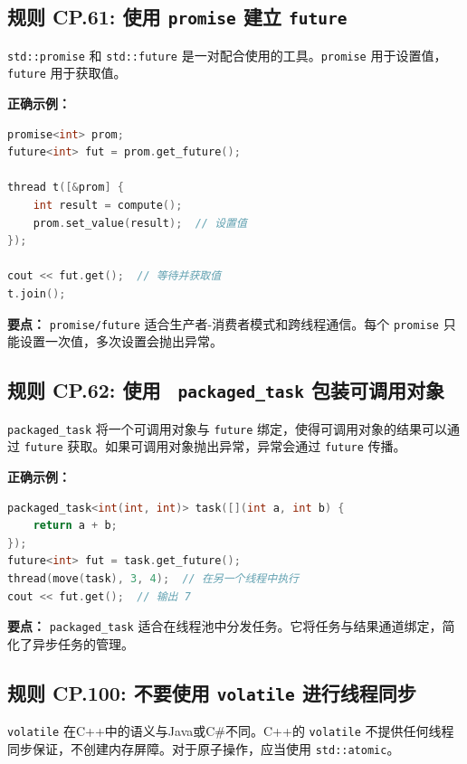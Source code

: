 \subsection*{\textbf{规则 CP.61:} 使用 \texttt{promise} 建立 \texttt{future}}

\texttt{std::promise} 和 \texttt{std::future} 是一对配合使用的工具。\texttt{promise} 用于设置值，\texttt{future} 用于获取值。

\textbf{正确示例：}

\begin{lstlisting}[language=C++]
promise<int> prom;
future<int> fut = prom.get_future();

thread t([&prom] {
    int result = compute();
    prom.set_value(result);  // 设置值
});

cout << fut.get();  // 等待并获取值
t.join();
\end{lstlisting}

\textbf{要点：} \texttt{promise/future} 适合生产者-消费者模式和跨线程通信。每个 \texttt{promise} 只能设置一次值，多次设置会抛出异常。

\subsection*{\textbf{规则 CP.62:} 使用 \texttt{ packaged\_task} 包装可调用对象}

\texttt{packaged\_task} 将一个可调用对象与 \texttt{future} 绑定，使得可调用对象的结果可以通过 \texttt{future} 获取。如果可调用对象抛出异常，异常会通过 \texttt{future} 传播。

\textbf{正确示例：}

\begin{lstlisting}[language=C++]
packaged_task<int(int, int)> task([](int a, int b) {
    return a + b;
});
future<int> fut = task.get_future();
thread(move(task), 3, 4);  // 在另一个线程中执行
cout << fut.get();  // 输出 7
\end{lstlisting}

\textbf{要点：} \texttt{packaged\_task} 适合在线程池中分发任务。它将任务与结果通道绑定，简化了异步任务的管理。

\subsection*{\textbf{规则 CP.100:} 不要使用 \texttt{volatile} 进行线程同步}

\texttt{volatile} 在C++中的语义与Java或C\#不同。C++的 \texttt{volatile} 不提供任何线程同步保证，不创建内存屏障。对于原子操作，应当使用 \texttt{std::atomic}。

